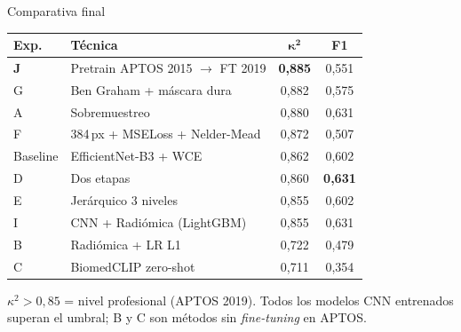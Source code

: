 \documentclass[aspectratio=169, 11pt]{beamer}
\begin{document}
\begin{frame}{Comparativa final}

  \centering
  \small
  \begin{tabular}{llcc}
    \toprule
    \rowcolor{azuloscuro!15}
    \textbf{Exp.} & \textbf{Técnica} & $\boldsymbol{\kappa^2}$ & \textbf{F1} \\
    \midrule
    \textbf{J} & Pretrain APTOS 2015 $\to$ FT 2019 & \textbf{0,885} & 0,551 \\
    G & Ben Graham + máscara dura       & 0,882 & 0,575 \\
    A & Sobremuestreo                   & 0,880 & 0,631 \\
    F & 384\,px + MSELoss + Nelder-Mead & 0,872 & 0,507 \\
    \rowcolor{azulmedio!10}
    Baseline & EfficientNet-B3 + WCE    & 0,862 & 0,602 \\
    D & Dos etapas                      & 0,860 & \textbf{0,631} \\
    E & Jerárquico 3 niveles            & 0,855 & 0,602 \\
    I & CNN + Radiómica (LightGBM)      & 0,855 & 0,631 \\
    B & Radiómica + LR L1               & 0,722 & 0,479 \\
    C & BiomedCLIP zero-shot            & 0,711 & 0,354 \\
    \bottomrule
  \end{tabular}

  \vspace{6pt}
  {\footnotesize $\kappa^2 > 0{,}85$ = nivel profesional (APTOS 2019).
   Todos los modelos CNN entrenados superan el umbral; B y C son métodos sin \textit{fine-tuning} en APTOS.}
\end{frame}
\end{document}
